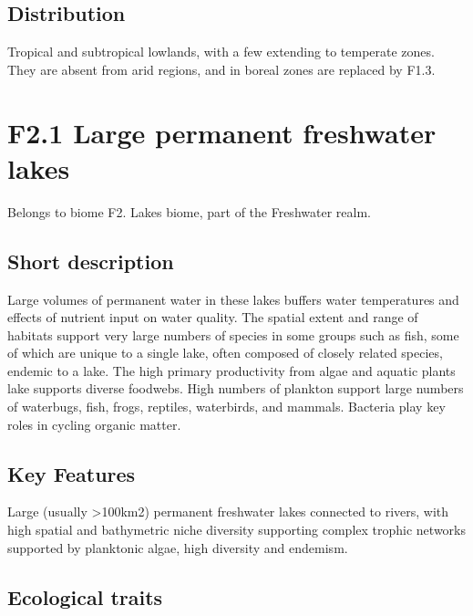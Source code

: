 \documentclass[
  letterpaper,
  DIV=11,
  numbers=noendperiod]{scrartcl}
\begin{document}
\subsection{Distribution}\label{distribution-115}

Tropical and subtropical lowlands, with a few extending to temperate
zones. They are absent from arid regions, and in boreal zones are
replaced by F1.3.

\section{F2.1 Large permanent freshwater
lakes}\label{f2.1-large-permanent-freshwater-lakes-1}

Belongs to biome F2. Lakes biome, part of the Freshwater realm.

\subsection{Short description}\label{short-description-116}

Large volumes of permanent water in these lakes buffers water
temperatures and effects of nutrient input on water quality. The spatial
extent and range of habitats support very large numbers of species in
some groups such as fish, some of which are unique to a single lake,
often composed of closely related species, endemic to a lake. The high
primary productivity from algae and aquatic plants lake supports diverse
foodwebs. High numbers of plankton support large numbers of waterbugs,
fish, frogs, reptiles, waterbirds, and mammals. Bacteria play key roles
in cycling organic matter.

\subsection{Key Features}\label{key-features-116}

Large (usually \textgreater100km2) permanent freshwater lakes connected
to rivers, with high spatial and bathymetric niche diversity supporting
complex trophic networks supported by planktonic algae, high diversity
and endemism.

\subsection{Ecological traits}\label{ecological-traits-116}
\end{document}
